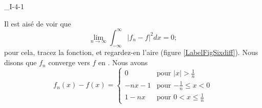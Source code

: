 

\begin{corrige}{_I-4-1}

Il est aisé de voir que
\begin{equation}
	\lim_{n\to\infty}\int_{-\infty}^{\infty}| f_n-f |^2dx=0;
\end{equation}
pour cela, tracez la fonction, et regardez-en l'aire (figure \ref{LabelFigSixdiff})\label{PgMoyenneQuadI14}. Nous disons que $f_n$ converge vers $f$ en . Nous avons
\begin{equation}
	f_n(x)-f(x)=
\begin{cases}
	0	&	\text{pour $| x |>\frac{1}{ n }$}\\
	-nx-1	&	 \text{pour $-\frac{ 1 }{ n }\leq x<0$}\\
	1-nx	&	 \text{pour $0<x\leq\frac{1}{ n }$}
\end{cases}
\end{equation}
\newcommand{\CaptionFigSixdiff}{Convergence en moyenne quadratique}


\end{corrige}
